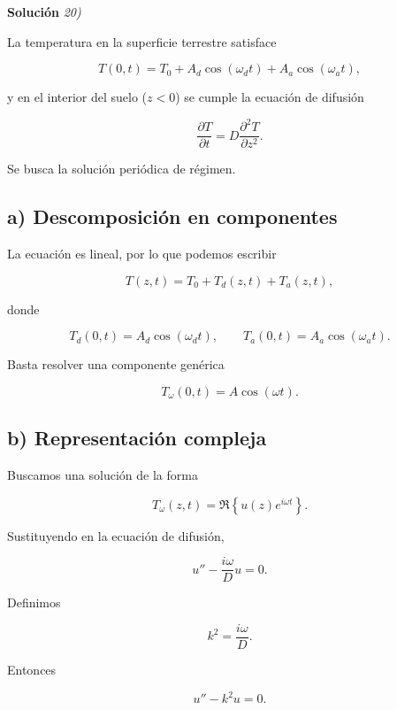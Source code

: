 \documentclass[11pt,spanish]{article}
\begin{document}
\vspace{0.5cm}
{\bf Soluci\'on }{\em 20)}
\vspace{0.5cm}

La temperatura en la superficie terrestre satisface

\[
T(0,t)
=
T_0
+
A_d\cos(\omega_d t)
+
A_a\cos(\omega_a t),
\]

y en el interior del suelo (\(z<0\)) se cumple la ecuación de difusión

\[
\frac{\partial T}{\partial t}
=
D\frac{\partial^2 T}{\partial z^2}.
\]

Se busca la solución periódica de régimen.


\subsection*{a) Descomposición en componentes}

La ecuación es lineal, por lo que podemos escribir

\[
T(z,t)
=
T_0
+
T_d(z,t)
+
T_a(z,t),
\]

donde

\[
T_d(0,t)=A_d\cos(\omega_d t),
\qquad
T_a(0,t)=A_a\cos(\omega_a t).
\]

Basta resolver una componente genérica

\[
T_\omega(0,t)=A\cos(\omega t).
\]


\subsection*{b) Representación compleja}

Buscamos una solución de la forma

\[
T_\omega(z,t)
=
\Re\!\left\{
u(z)e^{i\omega t}
\right\}.
\]

Sustituyendo en la ecuación de difusión,

%

\[
u''-\frac{i\omega}{D}u=0.
\]

Definimos

\[
k^2=\frac{i\omega}{D}.
\]

Entonces

\[
u''-k^2u=0.
\]

\end{document}
